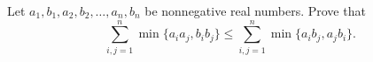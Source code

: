 Let $a_1, b_1, a_2, b_2, \dots , a_n, b_n$ be nonnegative real numbers. Prove that\[
\sum_{i, j = 1}^{n} \min\{a_ia_j, b_ib_j\} \le \sum_{i, j = 1}^{n} \min\{a_ib_j, a_jb_i\}.
\]
